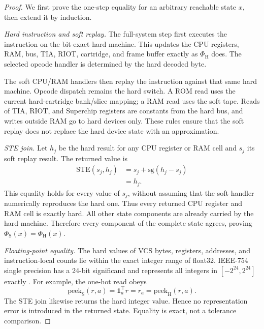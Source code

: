 \documentclass[letterpaper]{article} %
\newcommand{\sg}{\mathrm{sg}}
\begin{document}
\begin{proof}
We first prove the one-step equality for an arbitrary
reachable state $x$, then extend it by induction.

\textit{Hard instruction and soft replay.}
The full-system step first executes the instruction on
the bit-exact hard machine. This updates the CPU
registers, RAM, bus, TIA, RIOT, cartridge, and
frame buffer exactly as $\Phi_{\mathrm{H}}$ does.
The selected opcode handler is determined by the
hard decoded byte.

The soft CPU/RAM handlers then replay the instruction
against that same hard machine. Opcode dispatch
remains the hard switch. A ROM read uses the current
hard-cartridge bank/slice mapping; a RAM read uses
the soft tape. Reads of TIA, RIOT, and Superchip
registers are constants from the hard bus, and
writes outside RAM go to hard devices only.
These rules ensure that the soft replay does not
replace the hard device state with an approximation.

\textit{STE join.}
Let $h_j$ be the hard result for any CPU register
or RAM cell and $s_j$ its soft replay result.
The returned value is
\begin{equation}
\begin{aligned}
\mathrm{STE}(s_j,h_j)
&=s_j+\sg(h_j-s_j)\\
&=h_j.
\end{aligned}
\label{eq:s-branch-eq}
\end{equation}
This equality holds for every value of $s_j$, without
assuming that the soft handler numerically reproduces
the hard one. Thus every returned CPU register and
RAM cell is exactly hard. All other state components
are already carried by the hard machine. Therefore
every component of the complete state agrees, proving
$\Phi_{\mathrm{S}}(x)=\Phi_{\mathrm{H}}(x)$.

\textit{Floating-point equality.}
The hard values of VCS bytes, registers, addresses,
and instruction-local counts lie within the exact
integer range of float32. IEEE-754 single precision
has a 24-bit significand and represents all integers
in $[-2^{24},2^{24}]$ exactly
\citep{ieee754_2019,goldberg1991}.
For example, the one-hot read obeys
\begin{equation}
\mathrm{peek}_{\mathrm{S}}(r,a)
=\mathbf{1}_a^{\top}r=r_a
=\mathrm{peek}_{\mathrm{H}}(r,a).
\label{eq:s-peek-eq}
\end{equation}
The STE join likewise returns the hard integer value.
Hence no representation error is introduced in the
returned state. Equality is exact, not a tolerance
comparison.


\end{proof}
\end{document}
